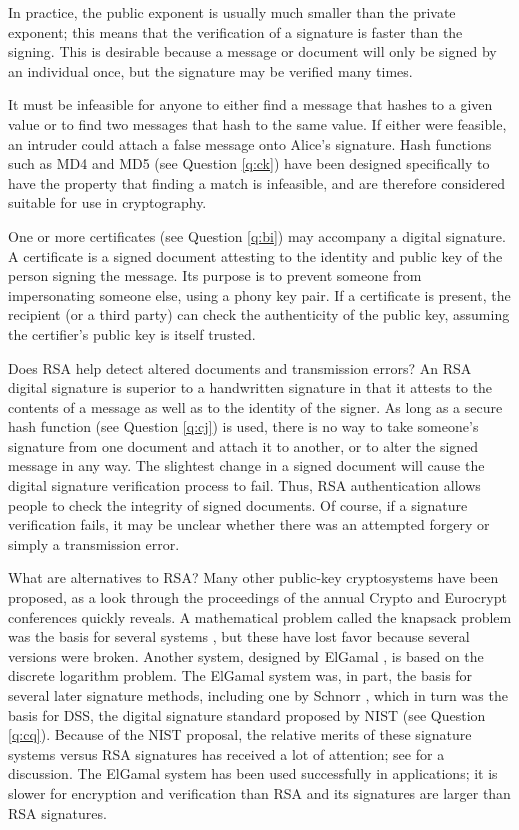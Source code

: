 In practice, the public exponent is usually much smaller than the 
private exponent; this means that the verification of a signature is faster 
than the signing. This is desirable because a message or document will 
only be signed by an individual once, but the signature may be verified 
many times.

It must be infeasible for anyone to either find a message that hashes to 
a given value or to find two messages that hash to the same value. If either 
were feasible, an intruder could attach a false message onto Alice's 
signature. Hash functions such as MD4 and MD5 (see Question \ref{q:ck}) 
have been designed specifically to have the property that finding a match 
is infeasible, and are therefore considered suitable for use in cryptography.

One or more certificates (see Question \ref{q:bi}) may accompany a digital 
signature. A certificate is a signed document attesting to the identity and 
public key of the person signing the message. Its purpose is to prevent
someone from impersonating someone else, using a phony key pair. If a 
certificate is present, the recipient (or a third party) can check the 
authenticity of the public key, assuming the certifier's public key is
itself trusted. 

{Does RSA help detect altered documents and transmission errors?}
An RSA digital signature is superior to a handwritten signature in that
it attests to the contents of a message as well as to the identity of
the signer. As long as a secure hash function (see Question \ref{q:cj}) 
is used, there is no way to take someone's signature from one document and 
attach it to another, or to alter the signed message in any way. The slightest 
change in a signed document will cause the digital signature verification
process to fail. Thus, RSA authentication allows people to check the
integrity of signed documents. Of course, if a signature verification
fails, it may be unclear whether there was an attempted forgery or 
simply a transmission error.

{What are alternatives to RSA?}
Many other public-key cryptosystems have been proposed, as a look through
the proceedings of the annual Crypto and Eurocrypt conferences quickly 
reveals. A mathematical problem called the knapsack problem was the basis 
for several systems \cite{merkle-hellman}, but these have lost favor because 
several versions were broken. Another system, designed by ElGamal 
\cite{elgamal}, is based on the discrete logarithm problem. The ElGamal
system was, in part, the basis for several later signature methods, including 
one by Schnorr \cite{schnorr}, which in turn was the basis for DSS, the 
digital signature standard proposed by NIST (see Question \ref{q:cq}). 
Because of the NIST proposal, the relative merits of these signature systems 
versus RSA signatures has received a lot of attention; see 
\cite{nist-dss-discuss} for a discussion. The ElGamal system has been used 
successfully in applications; it is slower for encryption and verification 
than RSA and its signatures are larger than RSA signatures.

